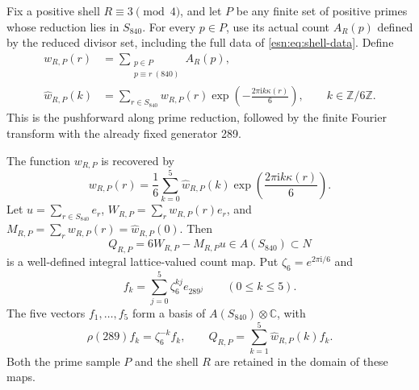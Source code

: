 Fix a positive shell \(R\equiv3\pmod4\), and let \(P\) be any
finite set of positive primes whose reduction lies in \(S_{840}\).
For every \(p\in P\), use its actual count \(A_R(p)\) defined by
the reduced divisor set, including the full data of
\eqref{esn:eq:shell-data}.  Define
\begin{equation}
 \begin{split}
 w_{R,P}(r)&=\sum_{\substack{p\in P\\p\equiv r\ (840)}}A_R(p),\\
 \widehat w_{R,P}(k)&=
       \sum_{r\in S_{840}}w_{R,P}(r)
                     \exp\left(-\frac{2\pi\mathrm i k\kappa(r)}6\right),
             \qquad k\in\mathbb Z/6\mathbb Z.
 \end{split}
 \label{esn:eq:sample-pushforward}
\end{equation}
This is the pushforward along prime reduction, followed by the finite
Fourier transform with the already fixed generator 289.

\begin{theorem}
\label{esn:thm:sample-fourier}
The function \(w_{R,P}\) is recovered by
\begin{equation}
 w_{R,P}(r)=\frac16\sum_{k=0}^5\widehat w_{R,P}(k)
                      \exp\left(\frac{2\pi\mathrm i k\kappa(r)}6\right).
 \label{esn:eq:fourier-inverse}
\end{equation}
Let \(u=\sum_{r\in S_{840}}e_r\),
\(W_{R,P}=\sum_rw_{R,P}(r)e_r\), and
\(M_{R,P}=\sum_rw_{R,P}(r)=\widehat w_{R,P}(0)\).
Then
\begin{equation}
 Q_{R,P}=6W_{R,P}-M_{R,P}u\in A(S_{840})\subset N
 \label{esn:eq:integral-count-augmentation}
\end{equation}
is a well-defined integral lattice-valued count map.  Put
\(\zeta_6=e^{2\pi\mathrm i/6}\) and
\[
 f_k=\sum_{j=0}^5\zeta_6^{kj}e_{289^j}\qquad(0\le k\le5).
\]
The five vectors \(f_1,\ldots,f_5\) form a basis of
\(A(S_{840})\otimes\mathbb C\), with
\begin{equation}
 \rho(289)f_k=\zeta_6^{-k}f_k,\qquad
 Q_{R,P}=\sum_{k=1}^5\widehat w_{R,P}(k)f_k.
 \label{esn:eq:fourier-augmentation-eigenvectors}
\end{equation}
Both the prime sample \(P\) and the shell \(R\) are retained in the
domain of these maps.
\end{theorem}

